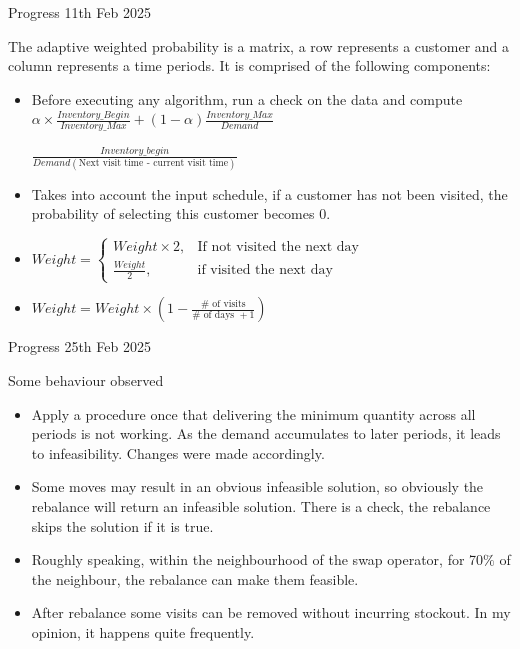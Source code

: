 \documentclass{beamer}
\begin{document}
\begin{frame}{Progress 11th Feb 2025}

The adaptive weighted probability is a matrix, a row represents a customer and a column represents a time periods. It is comprised of the following components:
\begin{itemize}
    \item Before executing any algorithm, run a check on the data and compute $\alpha\times\frac{Inventory\_Begin}{Inventory\_Max} + (1-\alpha) \frac{Inventory\_Max}{Demand}$
    
    $\frac{Inventory\_begin}{Demand(\text{Next visit time - current visit time})}$
    
    \item Takes into account the input schedule, if a customer has not been visited, the probability of selecting this customer becomes 0.
    \item  
    
    $Weight = \begin{cases}
        Weight\times 2, & \text{If not visited the next day} \\
        \frac{Weight}{2} , & \text{if visited the next day}
        \end{cases}$
    \item 
    $Weight = Weight \times (1 - \frac{\#\text{ of visits}}{\#\text{ of days }+1}) $
    
\end{itemize}
\end{frame}
\begin{frame}{Progress 25th Feb 2025}

Some behaviour observed
\begin{itemize}
    \item Apply a procedure once that delivering the minimum quantity across all periods is not working. As the demand accumulates to later periods, it leads to infeasibility. Changes were made accordingly.
    \item Some moves may result in an obvious infeasible solution, so obviously the rebalance will return an infeasible solution. There is a check, the rebalance skips the solution if it is true.
    \item Roughly speaking, within the neighbourhood of the swap operator, for 70$\%$ of the neighbour, the rebalance can make them feasible.
    \item After rebalance some visits can be removed without incurring stockout. In my opinion, it happens quite frequently.
    
\end{itemize}
\end{frame}
\end{document}
